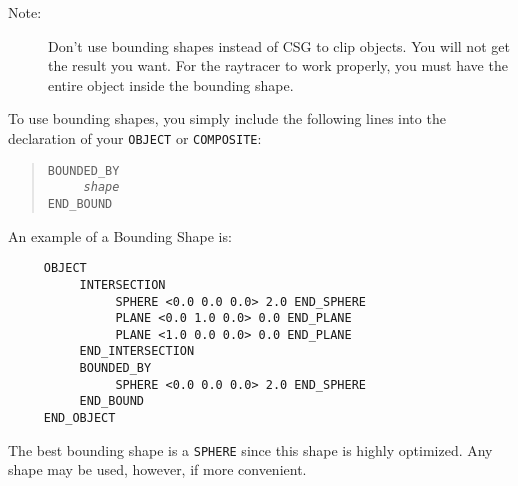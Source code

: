 \begin{description}
\item[Note:] Don't use bounding shapes instead of
CSG to clip objects.
You will not get the result you want.  For the raytracer to work
properly, you must have the entire object inside the bounding shape.
\end{description}

To use bounding shapes, you simply include the following lines into the
declaration of your {\tt OBJECT} or {\tt COMPOSITE}:
\begin{verse}
{\tt BOUNDED_BY} \\
{\tt \ \ \ \ \ {\em shape}} \\
{\tt END_BOUND}
\end{verse}
An example of a Bounding Shape is:
\begin{verbatim}
     OBJECT
          INTERSECTION
               SPHERE <0.0 0.0 0.0> 2.0 END_SPHERE
               PLANE <0.0 1.0 0.0> 0.0 END_PLANE
               PLANE <1.0 0.0 0.0> 0.0 END_PLANE
          END_INTERSECTION
          BOUNDED_BY
               SPHERE <0.0 0.0 0.0> 2.0 END_SPHERE
          END_BOUND
     END_OBJECT
\end{verbatim}
The best bounding shape is a {\tt SPHERE} since
this shape is highly optimized.
Any shape may be used, however, if more convenient.
